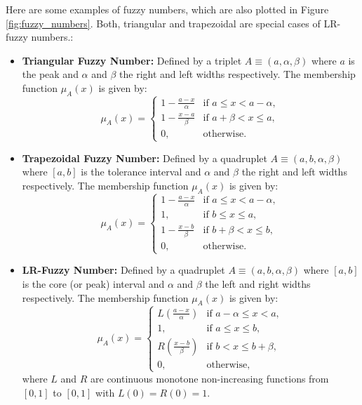 \begin{example}\label{ex:fuzzy_num}
    Here are some examples of fuzzy numbers, which are also plotted in Figure \ref{fig:fuzzy_numbers}. Both, triangular and trapezoidal are special cases of LR-fuzzy numbers.:
    \begin{itemize}
        \item \textbf{Triangular Fuzzy Number:} Defined by a triplet $A\equiv(a, \alpha, \beta)$ where $a$ is the peak and $\alpha$ and $\beta$ the right and left widths respectively. The membership function $\mu_A(x)$ is given by:
        \[
        \mu_A(x) = 
        \begin{cases} 
        1-\frac{a-x}{\alpha} & \text{if } a \leq x < a-\alpha, \\
        1-\frac{x-a}{\beta} & \text{if } a+\beta < x \leq a, \\
        0, & \text{otherwise.}
        \end{cases}
        \]
        
        \item \textbf{Trapezoidal Fuzzy Number:} Defined by a quadruplet $A\equiv(a, b, \alpha, \beta)$ where $[a,b]$ is the tolerance interval and $\alpha$ and $\beta$ the right and left widths respectively. The membership function $\mu_A(x)$ is given by:
        \[
        \mu_A(x) = 
        \begin{cases} 
        1-\frac{a-x}{\alpha} & \text{if } a \leq x < a-\alpha, \\
        1, & \text{if } b \leq x \leq a, \\
        1-\frac{x-b}{\beta} & \text{if } b+\beta < x \leq b, \\
        0, & \text{otherwise.}
        \end{cases}
        \]
        
        \item \textbf{LR-Fuzzy Number:} Defined by a quadruplet $A\equiv(a, b, \alpha, \beta)$ where $[a,b]$ is the core (or peak) interval and $\alpha$ and $\beta$ the left and right widths respectively. The membership function $\mu_A(x)$ is given by:
        \[
        \mu_A(x) = 
        \begin{cases} 
        L\left(\frac{a-x}{\alpha}\right) & \text{if } a-\alpha \leq x < a, \\
        1, & \text{if } a \leq x \leq b, \\
        R\left(\frac{x-b}{\beta}\right) & \text{if } b < x \leq b+\beta, \\
        0, & \text{otherwise,}
        \end{cases}
        \]
        where $L$ and $R$ are continuous monotone non-increasing functions from $[0,1]$ to $[0,1]$ with $L(0)=R(0)=1$.
    \end{itemize}
\end{example}
    
